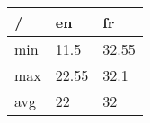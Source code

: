 \documentclass{article}%
\begin{document}
%
\normalsize%
\begin{longtable}{l l l}%
\hline%
/&en&fr\\%
\hline%
\endhead%
min&11.5&32.55\\%
max&22.55&32.1\\%
avg&22&32\\%
\end{longtable}%
\end{document}

